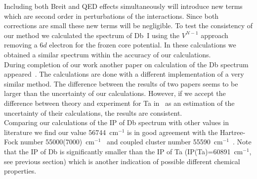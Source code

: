 \documentclass[10pt,a4paper, twoside, openright]{report}
\begin{document}
Including both Breit and QED effects simultaneously will introduce new terms which are second order in perturbations of the interactions. Since both corrections are small these new terms will be negligible.
To test the consistency of our method we calculated the spectrum of Db~I using the $V^{N-1}$ approach removing a $6d$ electron for the frozen core potential. In these calculations we obtained a similar spectrum within the accuracy of our calculations.\\
\linebreak
During completion of our work another paper on calculation of the Db spectrum appeared~\cite{Geddes2018}.
The calculations are done with a different implementation of a very similar method. The difference between the results 
of two papers seems to be larger than the uncertainty of our calculations. However, if we accept the difference between 
theory and experiment for Ta in~\cite{Geddes2018} as an estimation of the uncertainty of their calculations, the results
are consistent. \\
\linebreak
Comparing our calculations of the IP of Db spectrum with other values in literature we find our value 56744~cm$^{-1}$ is in good agreement with the Hartree-Fock number 55000(7000)~cm$^{-1}$~\cite{Dzuba2016} and
coupled cluster number 55590~cm$^{-1}$~\cite{BorschevskyPC}. Note that the IP of Db is significantly smaller than the IP
of Ta (IP(Ta)=60891~cm$^{-1}$, see previous section) which is another indication of possible different chemical properties. 
\end{document}
